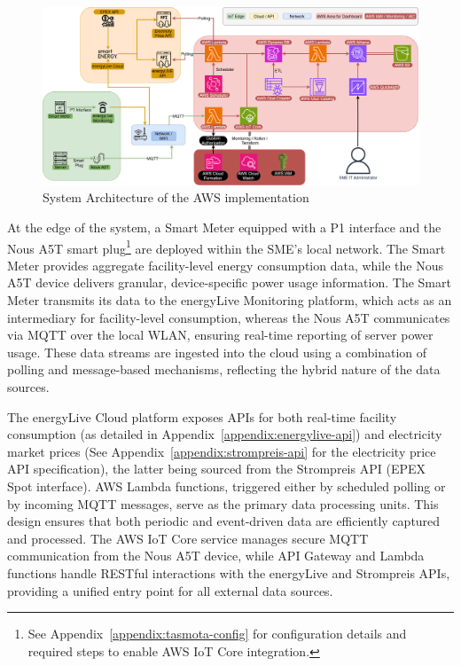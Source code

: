 \begin{figure}[htbp]
    \centering
    \includegraphics[width=1.2\textwidth]{fig/architektur_new_2.png}
    \caption{System Architecture of the AWS implementation}
    \label{fig:architecture}
\end{figure}

At the edge of the system, a Smart Meter equipped with a P1 interface and the Nous A5T smart plug\footnote{See Appendix~\ref{appendix:tasmota-config} for configuration details and required steps to enable AWS IoT Core integration.} are deployed within the SME's local network. The Smart Meter provides aggregate facility-level energy consumption data, while the Nous A5T device delivers granular, device-specific power usage information. The Smart Meter transmits its data to the energyLive Monitoring platform, which acts as an intermediary for facility-level consumption, whereas the Nous A5T communicates via MQTT over the local WLAN, ensuring real-time reporting of server power usage. These data streams are ingested into the cloud using a combination of polling and message-based mechanisms, reflecting the hybrid nature of the data sources.

The energyLive Cloud platform exposes APIs for both real-time facility consumption (as detailed in Appendix~\ref{appendix:energylive-api}) and electricity market prices (See Appendix~\ref{appendix:strompreis-api} for the electricity price API specification), the latter being sourced from the Strompreis API (EPEX Spot interface). AWS Lambda functions, triggered either by scheduled polling or by incoming MQTT messages, serve as the primary data processing units. This design ensures that both periodic and event-driven data are efficiently captured and processed. The AWS IoT Core service manages secure MQTT communication from the Nous A5T device, while API Gateway and Lambda functions handle RESTful interactions with the energyLive and Strompreis APIs, providing a unified entry point for all external data sources.


